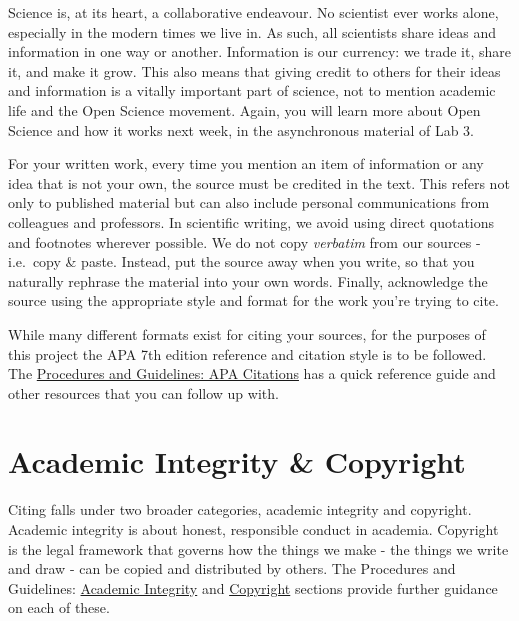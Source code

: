 \documentclass[
]{book}
\begin{document}
Science is, at its heart, a collaborative endeavour. No scientist ever works alone, especially in the modern times we live in. As such, all scientists share ideas and information in one way or another. Information is our currency: we trade it, share it, and make it grow. This also means that giving credit to others for their ideas and information is a vitally important part of science, not to mention academic life and the Open Science movement. Again, you will learn more about Open Science and how it works next week, in the asynchronous material of Lab 3.

For your written work, every time you mention an item of information or any idea that is not your own, the source must be credited in the text. This refers not only to published material but can also include personal communications from colleagues and professors. In scientific writing, we avoid using direct quotations and footnotes wherever possible. We do not copy \emph{verbatim} from our sources - i.e.~copy \& paste. Instead, put the source away when you write, so that you naturally rephrase the material into your own words. Finally, acknowledge the source using the appropriate style and format for the work you're trying to cite.

While many different formats exist for citing your sources, for the purposes of this project the APA 7th edition reference and citation style is to be followed. The \href{https://ubco-biology.github.io/Procedures-and-Guidelines/apa-citations.html}{Procedures and Guidelines: APA Citations} has a quick reference guide and other resources that you can follow up with.

\hypertarget{academic-integrity-copyright}{%
\section*{Academic Integrity \& Copyright}\label{academic-integrity-copyright}}

Citing falls under two broader categories, academic integrity and copyright. Academic integrity is about honest, responsible conduct in academia. Copyright is the legal framework that governs how the things we make - the things we write and draw - can be copied and distributed by others. The Procedures and Guidelines: \href{https://ubco-biology.github.io/Procedures-and-Guidelines/academic-integrity.html}{Academic Integrity} and \href{https://ubco-biology.github.io/Procedures-and-Guidelines/copyright-1.html}{Copyright} sections provide further guidance on each of these.
\end{document}
